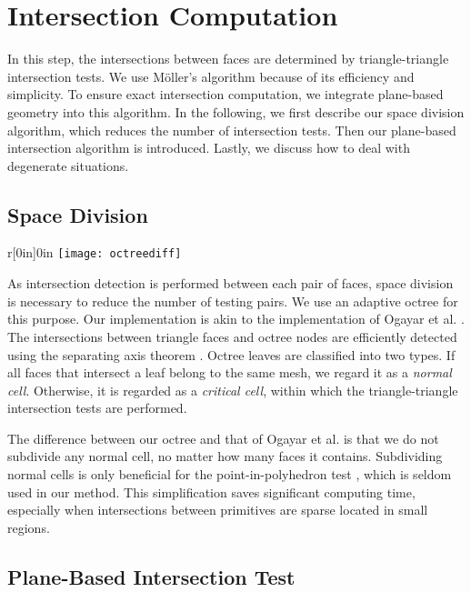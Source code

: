 \section{Intersection Computation}

\label{section:isect}

In this step, the intersections between faces are determined by triangle-triangle intersection tests. We use  M\"{o}ller's algorithm \cite{moller1997fast} because of its efficiency and simplicity. To ensure exact intersection computation, we integrate plane-based geometry into this algorithm. In the following, we first describe our space division algorithm, which reduces the number of intersection tests. Then our plane-based intersection algorithm is introduced. Lastly, we discuss how to deal with degenerate situations.

\subsection{Space Division}
\begin{wrapfigure}{r}[0in]{0in}
\texttt{[image: octreediff]}
\end{wrapfigure}

As intersection detection is performed between each pair of faces, space division is necessary to reduce the number of testing pairs. We use an adaptive octree for this purpose. Our implementation is akin to the implementation of Ogayar et al. \cite{ogayar2015deferred}. The intersections between triangle faces and octree nodes are efficiently detected using the separating axis theorem \cite{gottschalk1996obbtree}. Octree leaves are classified into two types. If all faces that intersect a leaf belong to the same mesh, we regard it as a \emph{normal cell}. Otherwise, it is regarded as a \emph{critical cell}, within which the triangle-triangle intersection tests are performed.


The difference between our octree and that of Ogayar et al. is that we do not subdivide any normal cell, no matter how many faces it contains. Subdividing normal cells is only beneficial for the point-in-polyhedron test \cite{frisken2002simple}, which is seldom used in our method. This simplification saves significant computing time, especially when intersections between primitives are sparse located in small regions.

\subsection{Plane-Based Intersection Test}

